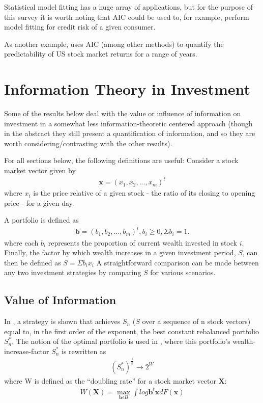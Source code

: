 \documentclass[10pt, twocolumn]{IEEEtran}
\begin{document}
Statistical model fitting has a huge array of applications, but for the purpose of this survey it is worth noting that
AIC could be used to, for example, perform model fitting for credit risk of a given consumer.

As another example, \cite{Pesaran1995} uses AIC (among other methods) to quantify the predictability
of US stock market returns for a range of years.

\section{Information Theory in Investment}
Some of the results below deal with the value or influence of information on investment in a
somewhat less information-theoretic centered approach (though in the abstract they still present
a quantification of information, and so they are worth considering/contrasting with the other
results).

For all sections below, the following definitions are useful:
Consider a stock market vector given by
\begin{gather*}
  \boldsymbol{x} = (x_{1}, x_{2}, ..., x_{m})^{t}
\end{gather*}
where $x_{i}$ is the price relative of a given stock - the ratio of its closing to opening price - for a given day.

A portfolio is defined as
\begin{gather*}
  \boldsymbol{b} = (b_{1}, b_{2}, ..., b_{m})^{t}, b_{i} \ge 0, \Sigma b_{i} = 1.
\end{gather*}
where each $b_{i}$ represents the proportion of current wealth invested in stock $i$.
Finally, the factor by which wealth increases
in a given investment period, $S$, can then be defined as $ S = \Sigma b_{i}x_{i} $
A straightforward comparison can be made between any two investment strategies by comparing $S$ for various scenarios.

\subsection{Value of Information}
In \cite{universal}, a strategy is shown that achieves $S_{n}$ ($S$ over a sequence of n stock vectors) equal to,
in the first order of the exponent, the best constant rebalanced portfolio $S^{*}_{n}$. The notion of the optimal
portfolio is used in \cite{cover1988}, where this portfolio's wealth-increase-factor $S^{*}_{n}$ is rewritten as
\begin{gather*}
  \left(S^{*}_{n}\right)^{\frac{1}{n}} \rightarrow 2^{W}
\end{gather*}
where W is defined as the ``doubling rate'' for a stock market vector $\boldsymbol{X}$:
\begin{gather*}
  W(\boldsymbol{X}) = \max_{\boldsymbol{b} \epsilon B}\int{log \boldsymbol{b}^{t}\boldsymbol{x} dF(\boldsymbol{x})}
\end{gather*}
\end{document}
